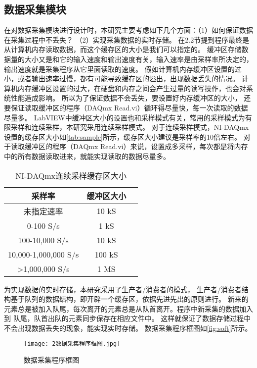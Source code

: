 \subsection{数据采集模块}
在对数据采集模块进行设计时，本研究主要考虑如下几个方面：（1）如何保证数据在采集过程中不丢失？
（2）实现采集数据的实时存储。
在2.2节提到程序最终是从计算机内存读取数据，而这个缓存区的大小是我们可以指定的。
缓冲区存储数据量的大小又是和它的输入速度和输出速度有关，输入速率是由采样率所决定的，
输出速度就是采集程序从它里面读取的速度。
假如计算机内存缓冲区设置的过小，或者输出速率过慢，都有可能导致缓存区的溢出，出现数据丢失的情况。
计算机内存缓冲区设置的过大，在硬盘和内存之间会产生过量的读写操作，也会对系统性能造成影响。
所以为了保证数据不会丢失，要设置好内存缓冲区的大小，
还要保证读取缓冲区的程序（DAQmx Read.vi）循环得尽量快，每一次读取的数据尽量多。
LabVIEW中缓冲区大小的设置也和采样模式有关，常用的采样模式为有限采样和连续采样，本研究采用连续采样模式。
对于连续采样模式，NI-DAQmx设置的缓存区大小如\autoref{tab:sample}所示，缓存区大小建议是采样率的10倍左右。
对于读取缓冲区的程序（DAQmx Read.vi）来说，设置成多采样，每次都是将内存中的所有数据读取进来，就能实现读取的数据尽量多。
\begin{table}[htbp]
    \centering
    \caption{\label{tab:sample}NI-DAQmx连续采样缓存区大小}
    \begin{tabular}{ccc}
     \toprule
     采样率&缓冲区大小\\
     \midrule
     未指定速率&10 kS\\
     0-100 S/s&1 kS\\
     100-10,000 S/s&10 kS\\
     10,000-1,000,000 S/s&100 kS\\
     >1,000,000 S/s&1 MS\\
     \bottomrule
    \end{tabular}
\end{table}

为实现数据的实时存储，本研究采用了生产者/消费者的模式，
生产者/消费者结构基于队列的数据结构，即开辟一个缓存区，依据先进先出的原则进行。
新来的元素总是被加入队尾，每次离开的元素总是从队首离开。程序中新采集的数据加入到
队尾，队首出队的元素同步保存在相应文件中。
这样就保证了数据存储过程中不会出现数据丢失的现象，能实现实时存储。
数据采集程序框图如\autoref{fig:soft}所示。
\begin{figure}[htbp]
    \centering
    \texttt{[image: 2数据采集程序框图.jpg]}
    \caption{\label{fig:soft}数据采集程序框图}
\end{figure}


